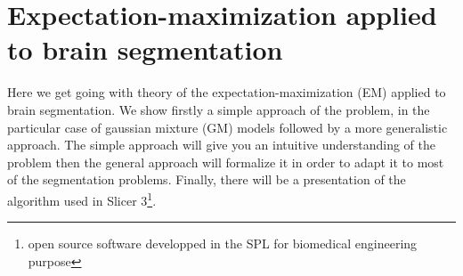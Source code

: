 \chapter{Expectation-maximization applied to brain segmentation}\label{sec:EM}
%
Here we get going with theory of the expectation-maximization (EM) applied to brain segmentation. We show firstly a simple approach of the problem, in the particular case of gaussian mixture (GM) models followed by a more generalistic approach. The simple approach will give you an intuitive understanding of the problem then the general approach will formalize it in order to adapt it to most of the segmentation problems. Finally, there will be a presentation of the algorithm used in Slicer 3\footnote{open source software developped in the SPL for biomedical engineering purpose}.
%
